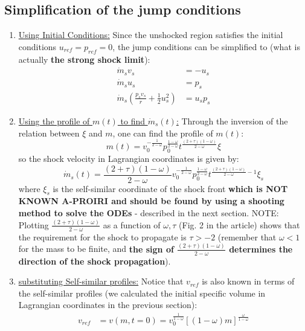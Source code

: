 \documentclass[11pt]{article}
\begin{document}
\subsection{Simplification of the jump conditions}
\begin{enumerate}
  \item \underline{Using Initial Conditions:} Since the unshocked region satisfies the initial conditions $u_{ref} = p_{ref} = 0$, the jump conditions can be simplified to (what is actually \textbf{the strong shock limit}):
  \begin{align}
    \dot{m}_s v_s &= -u_s \\
    \dot{m}_s u_s &= p_s \\
    \dot{m}_s \left(\frac{p_s v_s}{r} + \frac{1}{2} u_s^2\right) &= u_s p_s 
  \end{align}
  \item \underline{Using the profile of $m(t)$ to find $\dot{m}_s(t)$:} Through the inversion of the relation between $\xi$ and $m$, one can find the profile of $m(t)$:
  \begin{equation}
    m(t) = v_0^{-\frac{1}{2-\omega}} p_0^{\frac{1-\omega}{2-\omega}} t^{\frac{(2+\tau)(1-\omega)}{2-\omega}} \xi
  \end{equation}
  so the shock velocity in Lagrangian coordinates is given by:
  \begin{equation}
    \dot{m}_s(t) = \frac{(2+\tau)(1-\omega)}{2-\omega} v_0^{-\frac{1}{2-\omega}} p_0^{\frac{1-\omega}{2-\omega}} t^{\frac{(2+\tau)(1-\omega)}{2-\omega} - 1} \xi_s
  \end{equation}
  where $\xi_s$ is the self-similar coordinate of the shock front \textbf{which is NOT KNOWN A-PROIRI and should be found by using a shooting method to solve the ODEs} - described in the next section.
  NOTE: Plotting $\frac{(2+\tau)(1-\omega)}{2-\omega}$ as a function of $\omega, \tau$ (Fig. 2 in the article) shows that the requirement for the shock to propagate is $\tau > -2$ (remember that $\omega < 1$ for the mass to be finite, and \textbf{the sign of $\frac{(2+\tau)(1-\omega)}{2-\omega}$ determines the direction of the shock propagation}).
  \item \underline{substituting Self-similar profiles:} Notice that $v_{ref}$ is also known in terms of the self-similar profiles (we calculated the initial specific volume in Lagrangian coordinates in the previous section):
  \begin{equation}
    \begin{aligned}
    v_{ref} &= v(m, t=0) = v_0 ^{\frac{1}{1-\omega}}\left[(1-\omega)m \right]^{\frac{\omega}{1-\omega}} \\

\end{aligned}
\end{equation}
\end{enumerate}
\end{document}

